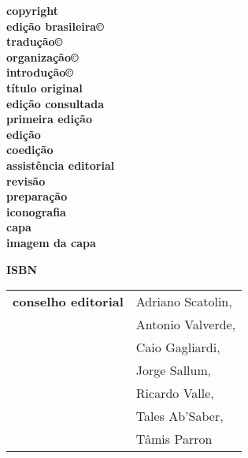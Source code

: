 \newcommand{\linha}[2]{\ifdef{#2}{\linhalayout{#1}{#2}}{}}

\begingroup\tiny
\parindent=0cm
\thispagestyle{empty}

\textbf{copyright}\quad                      	  {}\\
\textbf{edição brasileira©}\\
\textbf{tradução©}\\
\textbf{organização©}\\
\textbf{introdução©}\\

\textbf{título original}\\
\textbf{edição consultada}\\
\textbf{primeira edição}\\

\textbf{edição}\\
\textbf{coedição}\\
\textbf{assistência editorial}\\
\textbf{revisão}\quad			 			 {}\\
\textbf{preparação}\\
\textbf{iconografia}\\
\textbf{capa}\quad			 				 {}\\
\textbf{imagem da capa}\medskip

\textbf{ISBN}\smallskip

\hspace{-5pt}\begin{tabular}{ll}
\textbf{conselho editorial}        & Adriano Scatolin,  \\
							& Antonio Valverde,  \\
							& Caio Gagliardi,    \\
							& Jorge Sallum,      \\
							& Ricardo Valle,     \\
							& Tales Ab'Saber,    \\
							& Tâmis Parron      
\end{tabular}
  
